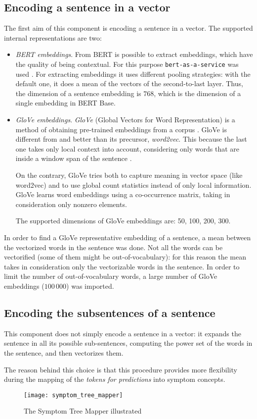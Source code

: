 \subsection{Encoding a sentence in a vector}
The first aim of this component is encoding a sentence in a vector. The supported internal representations are two:
\begin{itemize}
  \item \textit{BERT embeddings}. From BERT is possible to extract embeddings, which have the quality of being contextual. For this purpose \texttt{bert-as-a-service} was used \cite{baas}. For extracting embeddings it uses different pooling strategies: with the default one, it does a mean of the vectors of the second-to-last layer. Thus, the dimension of a sentence embedding is $768$, which is the dimension of a single embedding in BERT Base.
  \item \textit{GloVe embeddings}. \textit{GloVe} (Global Vectors for Word Representation) is a method of obtaining pre-trained embeddings from a corpus \cite{glove}. GloVe is different from and better than its precursor, \textit{word2vec}. This because the last one takes only local context into account, considering only words that are inside a window span of the sentence \cite{word2vec}.
  
  On the contrary, GloVe tries both to capture meaning in vector space (like word2vec) and to use global count statistics instead of only local information. GloVe learns word embeddings using a co-occurrence matrix, taking in consideration only nonzero elements.
  
  The supported dimensions of GloVe embeddings are: 50, 100, 200, 300.
\end{itemize}

In order to find a GloVe representative embedding of a sentence, a mean between the vectorized words in the sentence was done. Not all the words can be vectorified (some of them might be out-of-vocabulary): for this reason the mean takes in consideration only the vectorizable words in the sentence. In order to limit the number of out-of-vocabulary words, a large number of GloVe embeddings ($100\,000$) was imported.

\subsection{Encoding the subsentences of a sentence}
This component does not simply encode a sentence in a vector: it expands the sentence in all its possible sub-sentences, computing the power set of the words in the sentence, and then vectorizes them.

The reason behind this choice is that this procedure provides more flexibility during the mapping of the \textit{tokens for predictions} into symptom concepts.

\begin{figure}[h]
\centering
\texttt{[image: symptom\_tree\_mapper]}
\caption{The Symptom Tree Mapper illustrated}
\medskip
\label{fig:symptom_t_m}
\end{figure}

